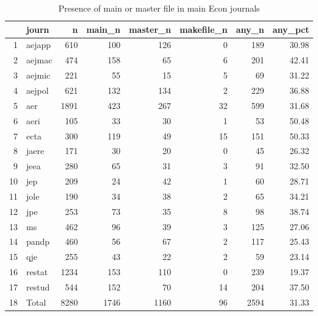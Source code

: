 \begin{table}[ht]
\centering
\caption{Presence of main or master file in main Econ journals} 
\label{tab:master:byjournal}
\begin{tabular}{rlrrrrrr}
  \hline
 & journ & n & main\_n & master\_n & makefile\_n & any\_n & any\_pct \\ 
  \hline
1 & aejapp & 610 & 100 & 126 &   0 & 189 & 30.98 \\ 
  2 & aejmac & 474 & 158 &  65 &   6 & 201 & 42.41 \\ 
  3 & aejmic & 221 &  55 &  15 &   5 &  69 & 31.22 \\ 
  4 & aejpol & 621 & 132 & 134 &   2 & 229 & 36.88 \\ 
  5 & aer & 1891 & 423 & 267 &  32 & 599 & 31.68 \\ 
  6 & aeri & 105 &  33 &  30 &   1 &  53 & 50.48 \\ 
  7 & ecta & 300 & 119 &  49 &  15 & 151 & 50.33 \\ 
  8 & jaere & 171 &  30 &  20 &   0 &  45 & 26.32 \\ 
  9 & jeea & 280 &  65 &  31 &   3 &  91 & 32.50 \\ 
  10 & jep & 209 &  24 &  42 &   1 &  60 & 28.71 \\ 
  11 & jole & 190 &  34 &  38 &   2 &  65 & 34.21 \\ 
  12 & jpe & 253 &  73 &  35 &   8 &  98 & 38.74 \\ 
  13 & ms & 462 &  96 &  39 &   3 & 125 & 27.06 \\ 
  14 & pandp & 460 &  56 &  67 &   2 & 117 & 25.43 \\ 
  15 & qje & 255 &  43 &  22 &   2 &  59 & 23.14 \\ 
  16 & restat & 1234 & 153 & 110 &   0 & 239 & 19.37 \\ 
  17 & restud & 544 & 152 &  70 &  14 & 204 & 37.50 \\ 
  18 & Total & 8280 & 1746 & 1160 &  96 & 2594 & 31.33 \\ 
   \hline
\end{tabular}
\end{table}
